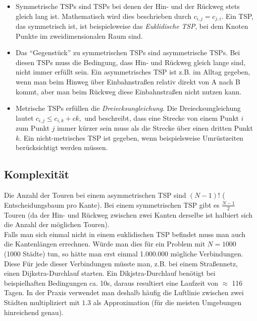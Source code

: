\documentclass[a4paper, 11pt]{article}
\begin{document}
\begin{itemize}
  \item Symmetrische TSPs sind TSPs bei denen der Hin- und der Rückweg stets
  gleich lang ist. Mathematisch wird dies beschrieben durch
  $c_{i,j} = c_{j,i}$. Ein TSP, das symmetrisch ist, ist beispielsweise das
  \textit{Euklidische TSP}, bei dem Knoten Punkte im zweidimensionalen Raum
  sind.

  \item Das ``Gegenstück'' zu symmetrischen TSPs sind asymmetrische TSPs.
  Bei diesen TSPs muss die Bedingung, dass Hin- und Rückweg gleich lange
  sind, nicht immer erfüllt sein. Ein asymmetrisches TSP ist z.B. im Alltag
  gegeben, wenn man beim Hinweg über Einbahnstraßen relativ direkt von A
  nach B kommt, aber man beim Rückweg diese Einbahnstraßen nicht nutzen kann.

  \item Metrische TSPs erfüllen die \textit{Dreiecksungleichung}. Die
  Dreiecksungleichung lautet $c_{i,j} \leq c_{i,k} + c{k, }$ und beschreibt,
  dass eine Strecke von einem Punkt $i$ zum Punkt $j$ immer kürzer sein
  muss als die Strecke über einen dritten Punkt $k$. Ein nicht-metrisches
  TSP ist gegeben, wenn beispielsweise Umrüstzeiten berücksichtigt werden
  müssen.
\end{itemize}

\subsection{Komplexität}

Die Anzahl der Touren bei einem asymmetrischen TSP sind $(N - 1)!$ (
Entscheidungsbaum pro Kante). Bei einem symmetrischen TSP gibt es
$\frac{N - 1}{2}$ Touren (da der Hin- und Rückweg zwischen zwei Kanten
derselbe ist halbiert sich die Anzahl der möglichen Touren).\\

Falls man sich einmal nicht in einem euklidischen TSP befindet muss man
auch die Kantenlängen errechnen. Würde man dies für ein Problem mit
$N = 1000$ (1000 Städte) tun, so hätte man erst einmal 1.000.000 mögliche
Verbindungen. Diese Für jede dieser Verbindungen müsste man, z.B. bei einem
Straßennetz, einen Dijkstra-Durchlauf starten. Ein Dikjstra-Durchlauf benötigt
bei beispielhaften Bedingungen ca. 10s, daraus resultiert eine Laufzeit von $\approx$
116 Tagen. In der Praxis verwendet man deshalb häufig die Luftlinie zwischen
zwei Städten multipliziert mit $1.3$ als Approximation (für die meisten
Umgebungen hinreichend genau).
\end{document}
